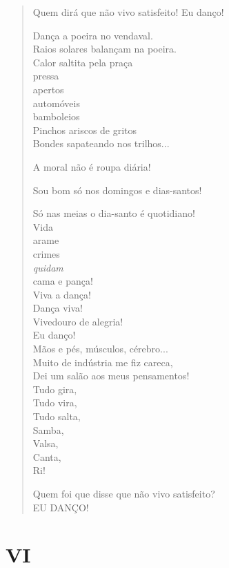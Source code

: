 \begin{verse}
Quem dirá que não vivo satisfeito! Eu danço!

Dança a poeira no vendaval.\\
Raios solares balançam na poeira.\\
Calor saltita pela praça\\
\quad\quad\quad{}pressa\\
\quad\quad\quad{}apertos\\
\quad\quad\quad{}automóveis\\
\quad\quad{}bamboleios\\
\quad{}Pinchos ariscos de gritos\\
Bondes sapateando nos trilhos...

A moral não é roupa diária!

Sou bom só nos domingos e dias-santos!

Só nas meias o dia-santo é quotidiano!\\
\quad\quad\quad{}Vida\\
\quad\quad\quad{}arame\\
\quad\quad\quad{}crimes\\
\quad\quad\quad{}\emph{quidam}\\
\quad\quad\quad{}cama e pança!\\
\quad\quad{}Viva a dança!\\
\quad\quad{}Dança viva!\\
\quad{}Vivedouro de alegria!\\
Eu danço!\\
Mãos e pés, músculos, cérebro...\\
\quad{}Muito de indústria me fiz careca,\\
\quad{}Dei um salão aos meus pensamentos!\\
\quad\quad\quad{}Tudo gira,\\
\quad\quad\quad{}Tudo vira,\\
\quad\quad\quad{}Tudo salta,\\
\quad\quad\quad{}Samba,\\
\quad\quad\quad{}Valsa,\\
\quad\quad\quad{}Canta,\\
\quad\quad\quad{}Ri!

Quem foi que disse que não vivo satisfeito?\\
EU DANÇO!
\end{verse}

\pagebreak
\section{VI}

